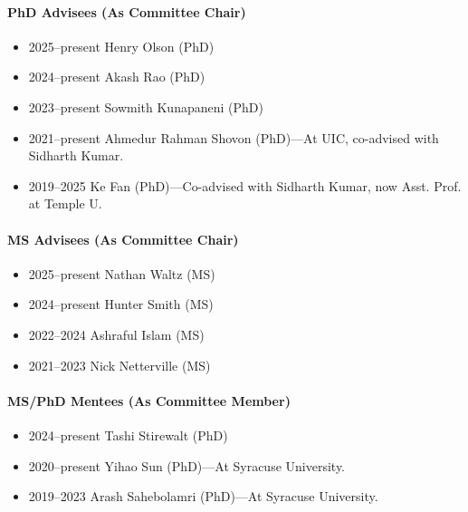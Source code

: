 \paragraph{PhD Advisees (As Committee Chair)}
\begin{itemize}
\vspace{0.15cm}\item 2025--present Henry Olson (PhD)
\item 2024--present Akash Rao (PhD)
\item 2023--present Sowmith Kunapaneni (PhD)
\item 2021--present Ahmedur Rahman Shovon (PhD)---At UIC, co-advised with Sidharth Kumar.
\item 2019--2025 Ke Fan (PhD)---Co-advised with Sidharth Kumar, now Asst. Prof. at Temple U.
\end{itemize}
\paragraph{MS Advisees (As Committee Chair)}
\begin{itemize}
\vspace{0.15cm}\item 2025--present Nathan Waltz (MS)
\item 2024--present Hunter Smith (MS)
\item 2022--2024 Ashraful Islam (MS)
\item 2021--2023 Nick Netterville (MS)
\end{itemize}
\paragraph{MS/PhD Mentees (As Committee Member)}
\begin{itemize}
\vspace{0.15cm}\item 2024--present Tashi Stirewalt (PhD)
\item 2020--present Yihao Sun (PhD)---At Syracuse University.
\item 2019--2023 Arash Sahebolamri (PhD)---At Syracuse University.
\end{itemize}
